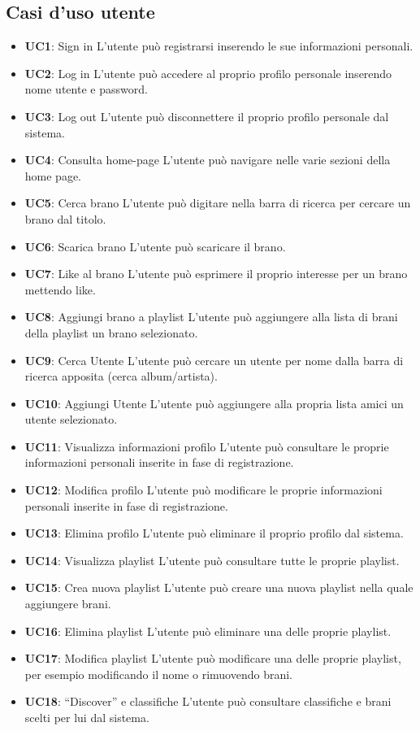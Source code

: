 \subsection{Casi d'uso utente}
\begin{itemize}
      \item \textbf{UC1}: Sign in L'utente può registrarsi inserendo le sue informazioni
            personali.
      \item \textbf{UC2}: Log in L'utente può accedere al proprio profilo personale
            inserendo nome utente e password.
      \item \textbf{UC3}: Log out L'utente può disconnettere il proprio profilo personale
            dal sistema.
      \item \textbf{UC4}: Consulta home-page L'utente può navigare nelle varie sezioni
            della home page.
      \item \textbf{UC5}: Cerca brano L'utente può digitare nella barra di ricerca per
            cercare un brano dal titolo.
      \item \textbf{UC6}: Scarica brano L'utente può scaricare il brano.
      \item \textbf{UC7}: Like al brano L'utente può esprimere il proprio interesse per un
            brano mettendo like.
      \item \textbf{UC8}: Aggiungi brano a playlist L'utente può aggiungere alla lista di
            brani della playlist un brano selezionato.
      \item \textbf{UC9}: Cerca Utente L'utente può cercare un utente per nome dalla barra
            di ricerca apposita (cerca album/artista).
      \item \textbf{UC10}: Aggiungi Utente L'utente può aggiungere alla propria lista amici
            un utente selezionato.
      \item \textbf{UC11}: Visualizza informazioni profilo L'utente può consultare le
            proprie informazioni personali inserite in fase di registrazione.
      \item \textbf{UC12}: Modifica profilo L'utente può modificare le proprie informazioni
            personali inserite in fase di registrazione.
      \item \textbf{UC13}: Elimina profilo L'utente può eliminare il proprio profilo dal
            sistema.
      \item \textbf{UC14}: Visualizza playlist L'utente può consultare tutte le proprie
            playlist.
      \item \textbf{UC15}: Crea nuova playlist L'utente può creare una nuova playlist nella
            quale aggiungere brani.
      \item \textbf{UC16}: Elimina playlist L'utente può eliminare una delle proprie
            playlist.
      \item \textbf{UC17}: Modifica playlist L'utente può modificare una delle proprie
            playlist, per esempio modificando il nome o rimuovendo brani.
      \item \textbf{UC18}: ``Discover'' e classifiche L'utente può consultare classifiche e
            brani scelti per lui dal sistema.

\end{itemize}


